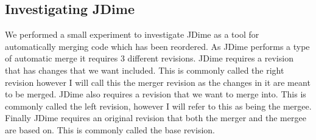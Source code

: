 \subsection{Investigating JDime}
We performed a small experiment to investigate JDime as a tool for automatically merging code which has been reordered.
% 
% 
As JDime performs a type of automatic merge it requires 3 different revisions.
JDime requires a revision that has changes that we want included.  This is commonly called the right revision however I will call this the merger revision as the changes in it are meant to be merged.
JDime also requires a revision that we want to merge into.  This is commonly called the left revision, however I will refer to this as being the mergee. 
Finally JDime requires an original revision that both the merger and the mergee are based on.
This is commonly called the base revision.

